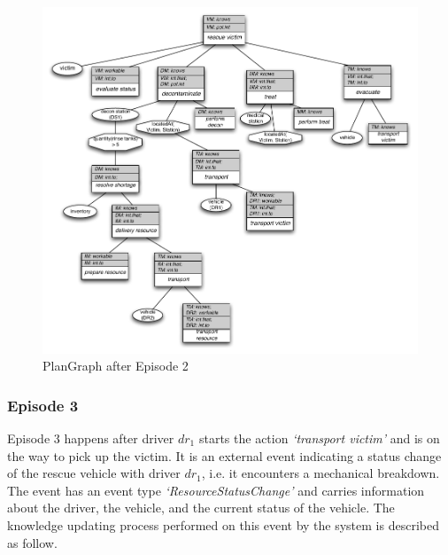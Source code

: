 \begin{figure}[htbp] %
	\centering
	\includegraphics[width=5.8in]{plangraph_ep2.pdf} 
	\caption{PlanGraph after Episode 2}
	\label{fig:plangraph_ep2}
\end{figure}
\subsubsection{Episode 3} %
\label{ssub:episode_3}
Episode 3 happens after driver $dr_1$ starts the action \emph{`transport victim'} and is on the way to pick up the victim. It is an external event indicating a status change of the rescue vehicle with driver $dr_1$, i.e. it encounters a mechanical breakdown. The event has an event type \emph{`ResourceStatusChange'} and carries information about the driver, the vehicle, and the current status of the vehicle. The knowledge updating process performed on this event by the system is described as follow.

